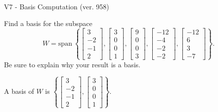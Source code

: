 \begin{exercise}
  \begin{exerciseTitle}V7 - Basis Computation (ver. 958)\end{exerciseTitle}
  \begin{exerciseStatement}
    Find a basis for the subspace 
\[W=\mathrm{span}\ \left\{\left[\begin{array}{r}
3 \\
-2 \\
-1 \\
2
\end{array}\right] , \left[\begin{array}{r}
3 \\
0 \\
0 \\
1
\end{array}\right] , \left[\begin{array}{r}
9 \\
0 \\
0 \\
3
\end{array}\right] , \left[\begin{array}{r}
-12 \\
-4 \\
-2 \\
-2
\end{array}\right] , \left[\begin{array}{r}
-12 \\
6 \\
3 \\
-7
\end{array}\right]\right\}.\]
 Be sure to explain why your result is a basis.


  \end{exerciseStatement}
  \begin{exerciseAnswer}
   A basis of \(W\) is  \(\left\{\left[\begin{array}{r}
3 \\
-2 \\
-1 \\
2
\end{array}\right] , \left[\begin{array}{r}
3 \\
0 \\
0 \\
1
\end{array}\right]\right\}\).
  


  \end{exerciseAnswer}
\end{exercise}